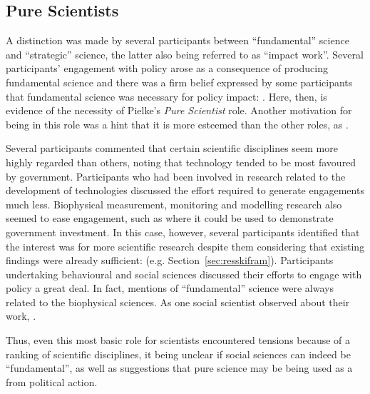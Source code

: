 \subsection{Pure Scientists}\label{sec:disscientist}
A distinction was made by several participants between ``fundamental'' science and ``strategic'' science, the latter also being referred to as ``impact work''. Several participants' engagement with policy arose as a consequence of producing fundamental science and there was a firm belief expressed by some participants that fundamental science was necessary for policy impact: . Here, then, is evidence of the necessity of Pielke's \emph{Pure Scientist} role. Another motivation for being in this role was a hint that it is more esteemed than the other roles, as . 

Several participants commented that certain scientific disciplines seem more highly regarded than others, noting that technology tended to be most favoured by government. Participants who had been involved in research related to the development of technologies discussed the effort required to generate engagements much less. Biophysical measurement, monitoring and modelling research also seemed to ease engagement, such as where it could be used to demonstrate government investment. In this case, however, several participants identified that the interest was for more scientific research despite them considering that existing findings were already sufficient:  (e.g. Section~\ref{sec:resskifram}). Participants undertaking behavioural and social sciences discussed their efforts to engage with policy a great deal. In fact, mentions of ``fundamental'' science were always related to the biophysical sciences. As one social scientist observed about their work, . 

Thus, even this most basic \SPI{} role for scientists encountered tensions because of a ranking of scientific disciplines, it being unclear if social sciences can indeed be ``fundamental'', as well as suggestions that pure science may be being used as a  from political action.

